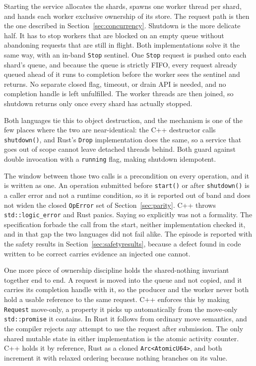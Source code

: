 \documentclass[english,oneside,a4paper,censored,csm,software-track-2020]{HYthesisML}
\begin{document}
Starting the service allocates the shards, spawns one worker thread per shard, and hands each
worker exclusive ownership of its store. The request path is then the one described in
Section~\ref{sec:concurrency}. Shutdown is the more delicate half. It has to stop
workers that are blocked on an empty queue without abandoning requests that are still in
flight. Both implementations solve it the same way, with an in-band \texttt{Stop} sentinel.
One \texttt{Stop} request is pushed onto each shard's queue, and because the queue is strictly
FIFO, every request already queued ahead of it runs to completion before the worker
sees the sentinel and returns. No separate closed flag, timeout, or drain API is needed,
and no completion handle is left unfulfilled. The worker threads are then joined, so shutdown
returns only once every shard has actually stopped.

Both languages tie this to object destruction, and the mechanism is one of the few places
where the two are near-identical: the C++ destructor calls \texttt{shutdown()}, and Rust's
\texttt{Drop} implementation does the same, so a service that goes out of scope cannot leave
detached threads behind. Both guard against double invocation with a \texttt{running} flag,
making shutdown idempotent.

The window between those two calls is a precondition on every operation, and it is written as
one. An operation submitted before \texttt{start()} or after \texttt{shutdown()} is a caller
error and not a runtime condition, so it is reported out of band and does not widen the closed
\texttt{OpError} set of Section~\ref{sec:parity}. C++ throws \texttt{std::logic\_error} and Rust
panics. Saying so explicitly was not a formality. The specification forbade the call from the
start, neither implementation checked it, and in that gap the two languages did not fail alike.
The episode is reported with the safety results in Section~\ref{sec:safetyresults}, because a
defect found in code written to be correct carries evidence an injected one cannot.

One more piece of ownership discipline holds the shared-nothing invariant together end to end. A
request is moved into the queue and not copied, and it carries its completion handle with it, so
the producer and the worker never both hold a usable reference to the same request. C++ enforces
this by making \texttt{Request} move-only, a property it picks up automatically from the
move-only \texttt{std::promise} it contains. In Rust it follows from ordinary move semantics, and
the compiler rejects any attempt to use the request after submission. The only shared mutable
state in either implementation is the atomic activity counter. C++ holds it by reference, Rust as
a cloned \texttt{Arc<AtomicU64>}, and both increment it with relaxed ordering because nothing
branches on its value.
\end{document}
